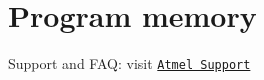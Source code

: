 \hypertarget{group__group__xmega__utils__progmem}{\section{Program memory}
\label{group__group__xmega__utils__progmem}
}
Support and F\-A\-Q\-: visit \href{http://www.atmel.com/design-support/}{\tt Atmel Support} 